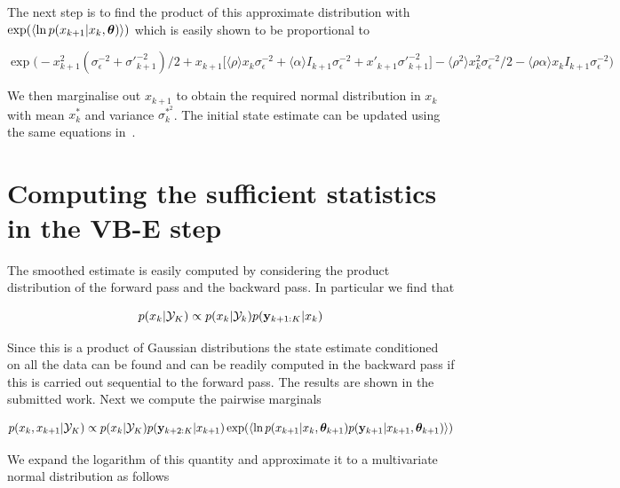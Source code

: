 \documentclass{article}
\begin{document}
The next step is to find the product of this approximate distribution with $\exp (\langle \ln p(x_{k+1} | x_{k},{\bm \theta})\rangle )$ which is easily shown to be proportional to

\begin{equation*}
\exp\bigg(-x_{k+1}^2(\sigma^{-2}_\epsilon + \sigma'^{-2}_{k+1})/2 + x_{k+1}\bigg[\langle \rho \rangle x_k\sigma^{-2}_\epsilon + \langle \alpha \rangle I_{k+1}\sigma^{-2}_\epsilon + x'_{k+1}\sigma'^{-2}_{k+1} \bigg] - \langle \rho^2 \rangle x_k^2\sigma^{-2}_\epsilon/2 - \langle \rho \alpha \rangle x_k I_{k+1}\sigma^{-2}_\epsilon  \bigg)
\end{equation*}

We then marginalise out $x_{k+1}$ to obtain the required normal distribution in $x_k$ with mean $x^*_k$ and variance $\sigma^{*^2}_k$. The initial state estimate can be updated using the same equations in~\cite{Smith_2003}.

\section{Computing the sufficient statistics in the VB-E step}

The smoothed estimate is easily computed by considering the product distribution of the forward pass and the backward pass. In particular we find that

\begin{equation*}
p(x_k | \mathcal{Y}_K) \propto p(x_k | \mathcal{Y}_k)p({\bf y}_{k+1:K} | x_k)
\end{equation*}

Since this is a product of Gaussian distributions the state estimate conditioned on all the data can be found and can be readily computed in the backward pass if this is carried out sequential to the forward pass. The results are shown in the submitted work. Next we compute the pairwise marginals

\begin{equation*}
p(x_k,x_{k+1}| \mathcal{Y}_K)\propto p(x_k|\mathcal{Y}_K)p({\bf y}_{k+2:K} |x_{k+1})\exp(\langle \ln p(x_{k+1}|x_k,{\bm \theta}_{k+1})p({\bf y}_{k+1}|x_{k+1},{\bm \theta}_{k+1}) \rangle)
\end{equation*}

We expand the logarithm of this quantity and approximate it to a multivariate normal distribution as follows
\end{document}
